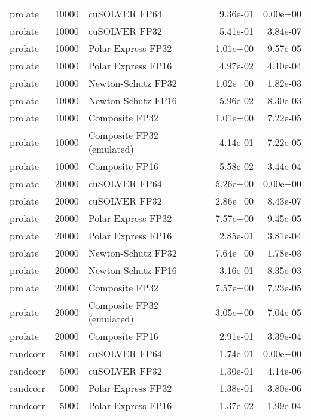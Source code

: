 \begin{table}
\begin{tabular}{lrlrr}
  prolate & 10000 &             cuSOLVER FP64 &  9.36e-01 &        0.00e+00 \\
  prolate & 10000 &             cuSOLVER FP32 &  5.41e-01 &        3.84e-07 \\
  prolate & 10000 &        Polar Express FP32 &  1.01e+00 &        9.57e-05 \\
  prolate & 10000 &        Polar Express FP16 &  4.97e-02 &        4.10e-04 \\
  prolate & 10000 &        Newton-Schutz FP32 &  1.02e+00 &        1.82e-03 \\
  prolate & 10000 &        Newton-Schutz FP16 &  5.96e-02 &        8.30e-03 \\
  prolate & 10000 &            Composite FP32 &  1.01e+00 &        7.22e-05 \\
  prolate & 10000 & Composite FP32 (emulated) &  4.14e-01 &        7.22e-05 \\
  prolate & 10000 &            Composite FP16 &  5.58e-02 &        3.44e-04 \\
  prolate & 20000 &             cuSOLVER FP64 &  5.26e+00 &        0.00e+00 \\
  prolate & 20000 &             cuSOLVER FP32 &  2.86e+00 &        8.43e-07 \\
  prolate & 20000 &        Polar Express FP32 &  7.57e+00 &        9.45e-05 \\
  prolate & 20000 &        Polar Express FP16 &  2.85e-01 &        3.81e-04 \\
  prolate & 20000 &        Newton-Schutz FP32 &  7.64e+00 &        1.78e-03 \\
  prolate & 20000 &        Newton-Schutz FP16 &  3.16e-01 &        8.35e-03 \\
  prolate & 20000 &            Composite FP32 &  7.57e+00 &        7.23e-05 \\
  prolate & 20000 & Composite FP32 (emulated) &  3.05e+00 &        7.04e-05 \\
  prolate & 20000 &            Composite FP16 &  2.91e-01 &        3.39e-04 \\
 randcorr &  5000 &             cuSOLVER FP64 &  1.74e-01 &        0.00e+00 \\
 randcorr &  5000 &             cuSOLVER FP32 &  1.30e-01 &        4.14e-06 \\
 randcorr &  5000 &        Polar Express FP32 &  1.38e-01 &        3.80e-06 \\
 randcorr &  5000 &        Polar Express FP16 &  1.37e-02 &        1.99e-04 \\

\end{tabular}
\end{table}
